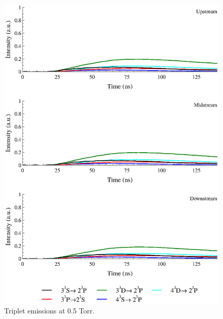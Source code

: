 \begin{figure}
  \centering
  \includegraphics{./chapters/extraem/figures/05torr_t.eps}
  \caption{Triplet emissions at 0.5 Torr.}
\end{figure}

